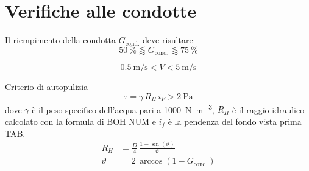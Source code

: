 \chapter{Verifiche alle condotte}

Il riempimento della condotta $G_\text{cond.}$ deve risultare 
\begin{equation}
    \SI{50}{\percent} \lessapprox G_\text{cond.} \lessapprox\SI{75}{\percent}
\end{equation}


\begin{equation}
    \SI{0.5}{\metre\per\second} < V <  \SI{5}{\metre\per\second}
\end{equation}

Criterio di autopulizia
\begin{equation}
    \tau = \gamma \, R_H \, i_F > \SI{2}{\pascal}
\end{equation}
dove $\gamma$ è il peso specifico dell'acqua pari a \SI{1000}{\newton\per\metre\cubed}, $R_H$ è il raggio idraulico calcolato con la formula di BOH NUM e $i_f$ è la pendenza del fondo vista prima TAB.  
\begin{align}
    R_H &= \frac{D}{4} \, \frac{1 - \sin(\vartheta)}{\vartheta} \\
    \vartheta &= 2 \, \arccos(1 - G_\text{cond.})
\end{align}

 